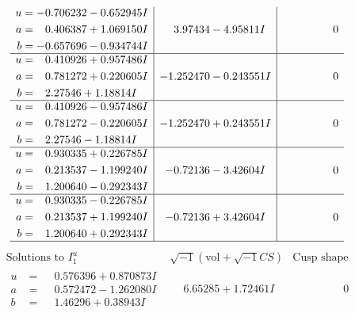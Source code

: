 \documentclass[1p]{elsarticle_modified}
\theoremstyle{definition}
\newcommand{\I}{\sqrt{-1}}
\begin{document}
$$\begin{array}{c|c|c}
\begin{aligned}
u &= -0.706232 - 0.652945 I \\
a &= \phantom{-}0.406387 + 1.069150 I \\
b &= -0.657696 - 0.934744 I\end{aligned}
 & \phantom{-}3.97434 - 4.95811 I & \phantom{-0.000000 } 0 \\ \hline\begin{aligned}
u &= \phantom{-}0.410926 + 0.957486 I \\
a &= \phantom{-}0.781272 + 0.220605 I \\
b &= \phantom{-}2.27546 + 1.18814 I\end{aligned}
 & -1.252470 - 0.243551 I & \phantom{-0.000000 } 0 \\ \hline\begin{aligned}
u &= \phantom{-}0.410926 - 0.957486 I \\
a &= \phantom{-}0.781272 - 0.220605 I \\
b &= \phantom{-}2.27546 - 1.18814 I\end{aligned}
 & -1.252470 + 0.243551 I & \phantom{-0.000000 } 0 \\ \hline\begin{aligned}
u &= \phantom{-}0.930335 + 0.226785 I \\
a &= \phantom{-}0.213537 - 1.199240 I \\
b &= \phantom{-}1.200640 - 0.292343 I\end{aligned}
 & -0.72136 - 3.42604 I & \phantom{-0.000000 } 0 \\ \hline\begin{aligned}
u &= \phantom{-}0.930335 - 0.226785 I \\
a &= \phantom{-}0.213537 + 1.199240 I \\
b &= \phantom{-}1.200640 + 0.292343 I\end{aligned}
 & -0.72136 + 3.42604 I & \phantom{-0.000000 } 0\\
 \hline 
 \end{array}$$\newpage$$\begin{array}{c|c|c}  
\text{Solutions to }I^u_{1}& \I (\text{vol} + \sqrt{-1}CS) & \text{Cusp shape}\\
 \hline 
\begin{aligned}
u &= \phantom{-}0.576396 + 0.870873 I \\
a &= \phantom{-}0.572472 - 1.262080 I \\
b &= \phantom{-}1.46296 + 0.38943 I\end{aligned}
 & \phantom{-}6.65285 + 1.72461 I & \phantom{-0.000000 } 0 \\ \hline\begin{aligned}

\end{aligned}
\end{array}$$
\end{document}
